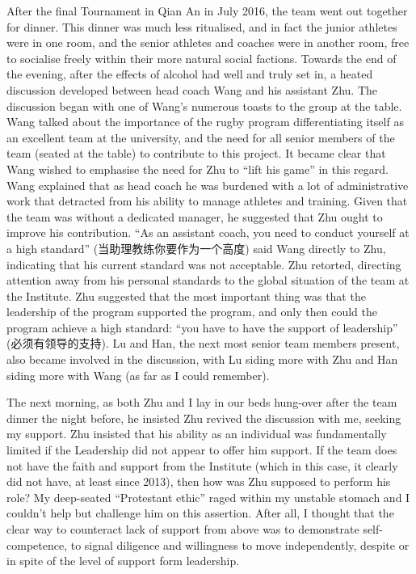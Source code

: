 \begin{CJK}{UTF8}{gbsn}
After the final Tournament in Qian An in July 2016, the team went out together for dinner.  This dinner was much less ritualised, and in fact the junior athletes were in one room, and the senior athletes and coaches were in another room, free to socialise freely within their more natural social factions.  Towards the end of the evening, after the effects of alcohol had well and truly set in, a heated discussion developed between head coach Wang and his assistant Zhu. The discussion began with one of Wang's numerous toasts to the group at the table. Wang talked about the importance of the rugby program differentiating itself as an excellent team at the university, and the need for all senior members of the team (seated at the table) to contribute to this project.  It became clear that Wang wished to emphasise the need for Zhu to ``lift his game'' in this regard. Wang explained that as head coach he was burdened with a lot of administrative work that detracted from his ability to manage athletes and training.  Given that the team was without a dedicated manager, he suggested that Zhu ought to improve his contribution. ``As an assistant coach, you need to conduct yourself at a high standard'' (当助理教练你要作为一个高度) said Wang directly to Zhu, indicating that his current standard was not acceptable.  Zhu retorted, directing attention away from his personal standards to the global situation of the team at the Institute.  Zhu suggested that the most important thing was that the leadership of the program supported the program, and only then could the program achieve a high standard: ``you have to have the support of leadership'' (必须有领导的支持).  Lu and Han, the next most senior team members present, also became involved in the discussion, with Lu siding more with Zhu and Han siding more with Wang (as far as I could remember).

The next morning, as both Zhu and I lay in our beds hung-over after the team dinner the night before, he insisted Zhu revived the discussion with me, seeking my support.   Zhu insisted that his ability as an individual was fundamentally limited if the Leadership did not appear to offer him support.  If the team does not have the faith and support from the Institute (which in this case, it clearly did not have, at least since 2013), then how was Zhu supposed to perform his role? My deep-seated ``Protestant ethic'' raged within my unstable stomach and I couldn't help but challenge him on this assertion.  After all, I thought that the clear way to counteract lack of support from above was to demonstrate self-competence, to signal diligence and willingness to move independently, despite or in spite of the level of support form leadership.


\end{CJK}
